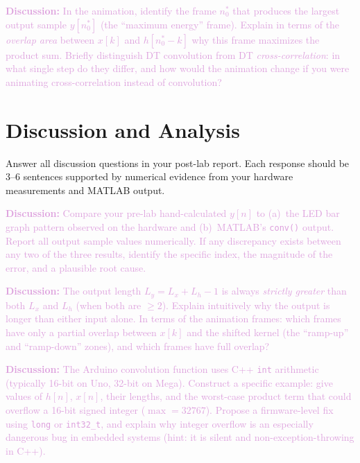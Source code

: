 \documentclass[11pt,letterpaper]{article}
\providecommand{\disECE}[1]{\textcolor{Plum}{\textbf{Discussion:} #1}}
\begin{document}
\disECE{In the animation, identify the frame $n_0^*$ that produces the largest output sample $y[n_0^*]$ (the ``maximum energy'' frame). Explain in terms of the \emph{overlap area} between $x[k]$ and $h[n_0^* - k]$ why this frame maximizes the product sum. Briefly distinguish DT convolution from DT \emph{cross-correlation}: in what single step do they differ, and how would the animation change if you were animating cross-correlation instead of convolution?}

\clearpage

\clearpage

\section{Discussion and Analysis}

Answer all discussion questions in your post-lab report. Each response should be 3--6 sentences supported by numerical evidence from your hardware measurements and MATLAB output.

\disECE{Compare your pre-lab hand-calculated $y[n]$ to (a)~the LED bar graph pattern observed on the hardware and (b)~MATLAB's \texttt{conv()} output. Report all output sample values numerically. If any discrepancy exists between any two of the three results, identify the specific index, the magnitude of the error, and a plausible root cause.}

\disECE{The output length $L_y = L_x + L_h - 1$ is always \emph{strictly greater} than both $L_x$ and $L_h$ (when both are $\geq 2$). Explain intuitively why the output is longer than either input alone. In terms of the animation frames: which frames have only a partial overlap between $x[k]$ and the shifted kernel (the ``ramp-up'' and ``ramp-down'' zones), and which frames have full overlap?}

\disECE{The Arduino convolution function uses C++ \texttt{int} arithmetic (typically 16-bit on Uno, 32-bit on Mega). Construct a specific example: give values of $h[n]$, $x[n]$, their lengths, and the worst-case product term that could overflow a 16-bit signed integer ($\max = 32767$). Propose a firmware-level fix using \texttt{long} or \texttt{int32\_t}, and explain why integer overflow is an especially dangerous bug in embedded systems (hint: it is silent and non-exception-throwing in C++).}
\end{document}
